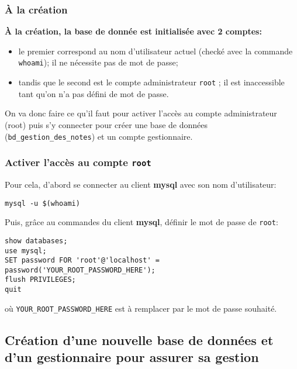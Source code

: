 \documentclass[11pt]{article}
\begin{document}
\subsubsection{À la création}
\label{sec:orgf19e4ac}

\textbf{À la création, la base de donnée est initialisée avec 2 comptes:} 
\begin{itemize}
\item le premier correspond au nom d'utilisateur actuel (checké avec la commande \texttt{whoami}); il ne nécessite pas de mot de passe;
\item tandis que le second est le compte administrateur \texttt{root} ; il est inaccessible tant qu'on n'a pas défini de mot de passe.
\end{itemize}

On va donc faire ce qu'il faut pour activer l'accès au compte administrateur (root) puis s'y connecter pour créer une base de données (\texttt{bd\_gestion\_des\_notes}) et un compte gestionnaire.  

\subsubsection{Activer l'accès au compte \texttt{root}}
\label{sec:org687c8f8}

Pour cela, d'abord se connecter au client \textbf{mysql}  avec son nom d'utilisateur:

\begin{verbatim}
mysql -u $(whoami)
\end{verbatim}

Puis, grâce au commandes du client \textbf{mysql}, définir le mot de passe de \texttt{root}:

\begin{verbatim}
show databases;
use mysql;
SET password FOR 'root'@'localhost' = 
password('YOUR_ROOT_PASSWORD_HERE');
flush PRIVILEGES;
quit
\end{verbatim}

où \texttt{YOUR\_ROOT\_PASSWORD\_HERE} est à remplacer par le mot de passe souhaité.

\subsection{Création d'une nouvelle base de données et d'un gestionnaire pour assurer sa gestion}
\label{sec:org5429560}
\end{document}
